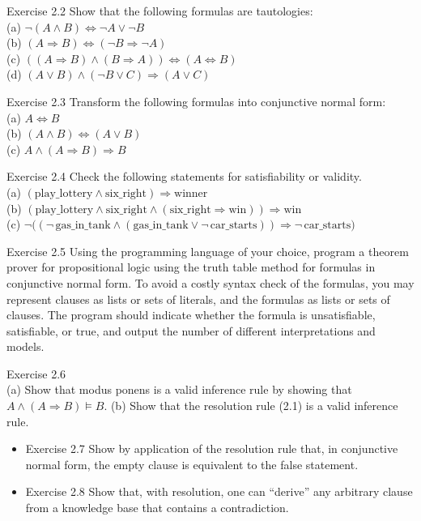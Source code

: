 \documentclass[10pt]{book}
\begin{document}
Exercise 2.2 Show that the following formulas are tautologies:\\
(a) $\neg(A \wedge B) \Leftrightarrow \neg A \vee \neg B$\\
(b) $(A \Rightarrow B) \Leftrightarrow (\neg B \Rightarrow \neg A)$\\
(c) $((A \Rightarrow B) \wedge (B \Rightarrow A)) \Leftrightarrow (A \Leftrightarrow B)$\\
(d) $(A \vee B) \wedge (\neg B \vee C) \Rightarrow (A \vee C)$

Exercise 2.3 Transform the following formulas into conjunctive normal form:\\
(a) $A \Leftrightarrow B$\\
(b) $(A \wedge B) \Leftrightarrow (A \vee B)$\\
(c) $A \wedge (A \Rightarrow B) \Rightarrow B$

Exercise 2.4 Check the following statements for satisfiability or validity.\\
(a) $(\text{play\_lottery} \wedge \text{six\_right}) \Rightarrow \text{winner}$\\
(b) $(\text{play\_lottery} \wedge \text{six\_right} \wedge (\text{six\_right} \Rightarrow \text{win})) \Rightarrow \text{win}$\\
(c) $\neg\big((\neg\,\text{gas\_in\_tank} \wedge (\text{gas\_in\_tank} \vee \neg\,\text{car\_starts})) \Rightarrow \neg\,\text{car\_starts}\big)$

Exercise 2.5 Using the programming language of your choice, program a theorem prover for propositional logic using the truth table method for formulas in conjunctive normal form. To avoid a costly syntax check of the formulas, you may represent clauses as lists or sets of literals, and the formulas as lists or sets of clauses. The program should indicate whether the formula is unsatisfiable, satisfiable, or true, and output the number of different interpretations and models.

Exercise 2.6\\
(a) Show that modus ponens is a valid inference rule by showing that $A \wedge (A \Rightarrow B) \models B$.
(b) Show that the resolution rule (2.1) is a valid inference rule.

\begin{itemize}
  \item Exercise 2.7 Show by application of the resolution rule that, in conjunctive normal form, the empty clause is equivalent to the false statement.
  \item Exercise 2.8 Show that, with resolution, one can ``derive'' any arbitrary clause from a knowledge base that contains a contradiction.
\end{itemize}
\end{document}
